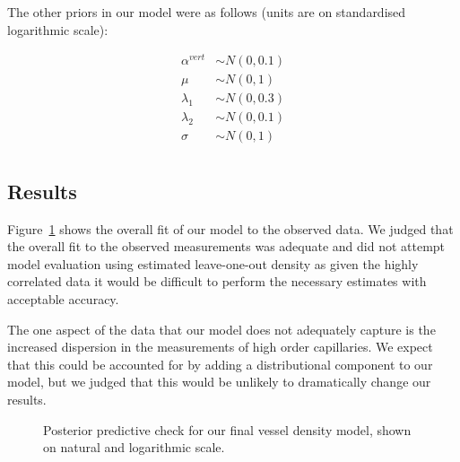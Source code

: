 \documentclass[
  letterpaper,
  DIV=11,
  numbers=noendperiod,
  oneside]{scrartcl}
\theoremstyle{plain}
\theoremstyle{remark}
\begin{document}
The other priors in our model were as follows (units are on standardised
logarithmic scale):

\begin{align}
  \alpha^{vert} &\sim N(0, 0.1) \label{eq:density-other-priors} \\
  \mu &\sim N(0, 1) \nonumber \\
  \lambda_1 &\sim N(0, 0.3) \nonumber \\
  \lambda_2 &\sim N(0, 0.1) \nonumber \\
  \sigma &\sim N(0, 1) \nonumber \\
\end{align}

\subsection{Results}\label{results-4}

Figure~\ref{fig-density-ppc} shows the overall fit of our model to the
observed data. We judged that the overall fit to the observed
measurements was adequate and did not attempt model evaluation using
estimated leave-one-out density as given the highly correlated data it
would be difficult to perform the necessary estimates with acceptable
accuracy.

The one aspect of the data that our model does not adequately capture is
the increased dispersion in the measurements of high order capillaries.
We expect that this could be accounted for by adding a distributional
component to our model, but we judged that this would be unlikely to
dramatically change our results.

\begin{figure}


\caption{\label{fig-density-ppc}Posterior predictive check for our final
vessel density model, shown on natural and logarithmic scale.}

\end{figure}%
\end{document}
